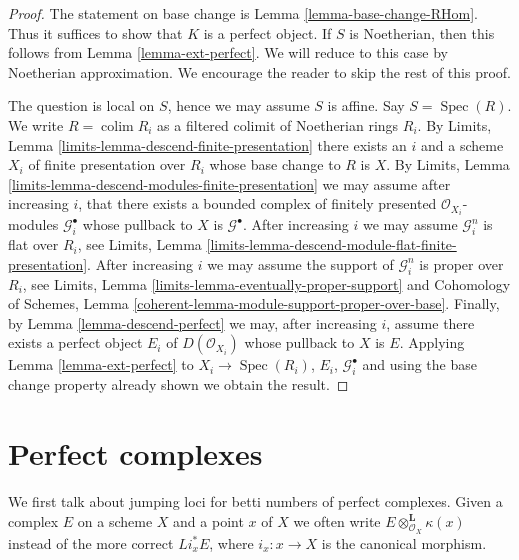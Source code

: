 \documentclass{stacks-project}
\theoremstyle{plain}
\theoremstyle{definition}
\theoremstyle{remark}
\numberwithin{equation}{subsection}
\def\colim{\mathop{\mathrm{colim}}\nolimits}
\def\Spec{\mathop{\mathrm{Spec}}}
\begin{document}
\begin{proof}
The statement on base change is Lemma \ref{lemma-base-change-RHom}.
Thus it suffices to show that $K$ is a perfect object. If $S$ is
Noetherian, then this follows from
Lemma \ref{lemma-ext-perfect}.
We will reduce to this case by Noetherian approximation.
We encourage the reader to skip the rest of this proof.

\medskip\noindent
The question is local on $S$, hence we may assume $S$ is affine.
Say $S = \Spec(R)$. We write $R = \colim R_i$ as a filtered colimit
of Noetherian rings $R_i$. By Limits, Lemma
\ref{limits-lemma-descend-finite-presentation}
there exists an $i$ and a scheme $X_i$ of finite presentation over $R_i$
whose base change to $R$ is $X$. By
Limits, Lemma \ref{limits-lemma-descend-modules-finite-presentation}
we may assume after increasing $i$, that there exists a bounded complex
of finitely presented $\mathcal{O}_{X_i}$-modules $\mathcal{G}_i^\bullet$
whose pullback to $X$ is $\mathcal{G}^\bullet$. After increasing $i$
we may assume $\mathcal{G}_i^n$ is flat over $R_i$, see
Limits, Lemma \ref{limits-lemma-descend-module-flat-finite-presentation}.
After increasing $i$ we may assume the support of $\mathcal{G}_i^n$
is proper over $R_i$, see
Limits, Lemma \ref{limits-lemma-eventually-proper-support} and
Cohomology of Schemes, Lemma
\ref{coherent-lemma-module-support-proper-over-base}.
Finally, by Lemma \ref{lemma-descend-perfect}
we may, after increasing $i$, assume there exists a perfect
object $E_i$ of $D(\mathcal{O}_{X_i})$ whose pullback to
$X$ is $E$. Applying Lemma \ref{lemma-ext-perfect}
to $X_i \to \Spec(R_i)$, $E_i$, $\mathcal{G}_i^\bullet$ and using the
base change property already shown we obtain the result.
\end{proof}









\section{Perfect complexes}
\label{section-perfect-complexes}

\noindent
We first talk about jumping loci for betti numbers of perfect complexes.
Given a complex $E$ on a scheme $X$ and a point $x$ of $X$ we often write
$E \otimes_{\mathcal{O}_X}^\mathbf{L} \kappa(x)$ instead of the more correct
$Li_x^*E$, where $i_x : x \to X$ is the canonical morphism.
\end{document}
